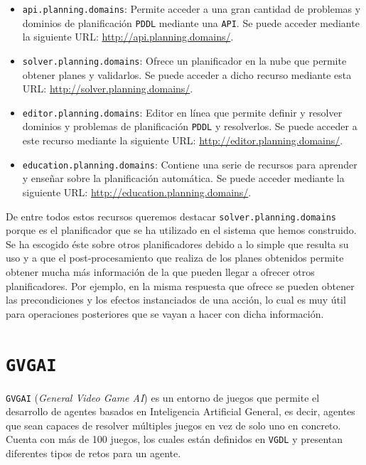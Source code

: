 \begin{itemize}[label=\textbullet]
    \item \texttt{api.planning.domains}: Permite acceder a una gran cantidad
    de problemas y dominios de planificación \texttt{PDDL} mediante una \texttt{API}.
    Se puede acceder mediante la siguiente URL: \url{http://api.planning.domains/}.
    \item \texttt{solver.planning.domains}: Ofrece un planificador en la nube que
    permite obtener planes y validarlos. Se puede acceder a dicho recurso mediante esta URL:
    \url{http://solver.planning.domains/}.
    \item \texttt{editor.planning.domains}: Editor en línea que permite definir
    y resolver dominios y problemas de planificación \texttt{PDDL} y resolverlos. Se puede
    acceder a este recurso mediante la siguiente URL: \url{http://editor.planning.domains/}.
    \item \texttt{education.planning.domains}: Contiene una serie de recursos para
    aprender y enseñar sobre la planificación automática. Se puede acceder mediante
    la siguiente URL: \url{http://education.planning.domains/}.
\end{itemize}

De entre todos estos recursos queremos destacar \texttt{solver.planning.domains} porque es el
planificador que se ha utilizado en el sistema que hemos construido. Se ha escogido éste sobre
otros planificadores debido a lo simple que resulta su uso y a que el post-procesamiento que realiza
de los planes obtenidos permite obtener mucha más información de la que pueden llegar a ofrecer
otros planificadores. Por ejemplo, en la misma respuesta que ofrece se pueden
obtener las precondiciones y los efectos instanciados de una acción, lo cual es muy útil para
operaciones posteriores que se vayan a hacer con dicha información.

\section{\texttt{GVGAI}}

\texttt{GVGAI} (\textit{General Video Game AI}) \cite{7038214} es un entorno de juegos que permite
el desarrollo de agentes basados en Inteligencia Artificial General, es decir, agentes que sean
capaces de resolver múltiples juegos en vez de solo uno en concreto. Cuenta con más de 100 juegos,
los cuales están definidos en \texttt{VGDL} y presentan diferentes tipos de retos para un agente.

